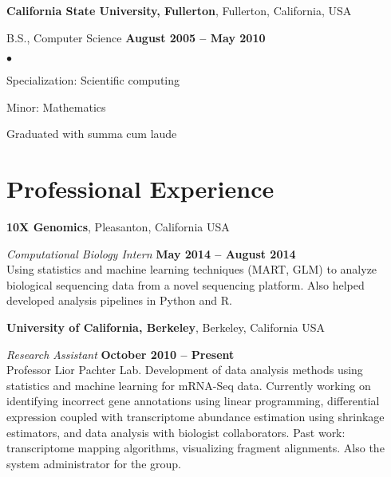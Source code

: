 \documentclass[margin,line]{res}
\newenvironment{list2}{
  \begin{list}{$\bullet$}{%
      \setlength{\itemsep}{0in}
      \setlength{\parsep}{0in} \setlength{\parskip}{0in}
      \setlength{\topsep}{0in} \setlength{\partopsep}{0in}
      \setlength{\leftmargin}{0.2in}}}{\end{list}}
\begin{document}
\begin{resume}
{\bf California State University, Fullerton}, Fullerton, California, USA

\vspace{-.3cm}
B.S., Computer Science \hfill {\bf August 2005 -- May 2010}\\
\vspace{-.45cm}
\begin{list2}
\vspace*{1mm}
\item Specialization: Scientific computing
\item Minor: Mathematics
\item Graduated with summa cum laude
\end{list2}


\section{\sc Professional Experience}

{\bf 10X Genomics}, Pleasanton, California USA
\vspace{-.3cm}

{\em Computational Biology Intern} \hfill {\bf May 2014 -- August 2014}\\
Using statistics and machine learning techniques (MART, GLM) to analyze
biological sequencing data from a novel sequencing platform. Also helped
developed analysis pipelines in Python and R.

{\bf University of California, Berkeley}, Berkeley, California USA
\vspace{-.3cm}

{\em Research Assistant} \hfill {\bf October 2010 -- Present}\\
Professor Lior Pachter Lab. Development of data analysis methods using
statistics and machine learning for mRNA-Seq data. Currently working on
identifying incorrect gene annotations using linear programming, differential
expression coupled with transcriptome abundance estimation using shrinkage
estimators, and data analysis with biologist collaborators. Past work:
transcriptome mapping algorithms, visualizing fragment alignments. Also the
system administrator for the group.


\end{resume}
\end{document}
